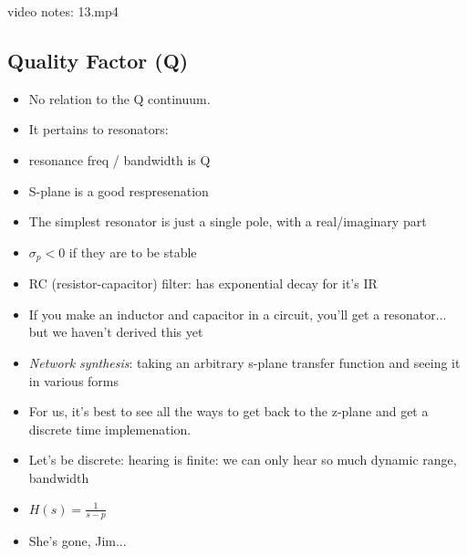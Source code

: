 video notes: 13.mp4


\subsection*{Quality Factor (Q)}
\begin{itemize}

\item{No relation to the Q continuum.}

\item{
It pertains to resonators:
}

\item{resonance freq / bandwidth is Q}

\item{S-plane is a good respresenation}
\item{The simplest resonator is just a single pole, with a 
real/imaginary part}
\item{$\sigma_p < 0$ if they are to be stable}
\item{RC (resistor-capacitor) filter: has exponential decay for it's IR}
\item{If you make an inductor and capacitor in a circuit, you'll get a 
resonator... but we haven't derived this yet}
\item{\textit{Network synthesis}: taking an arbitrary s-plane transfer function and seeing it in 
various forms}
\item{For us, it's best to see all the ways to get back to the z-plane and get
a discrete time implemenation.}
\item{Let's be discrete: hearing is finite: we can only hear so much dynamic range, bandwidth}
\item{$H(s) = \frac{1}{s - p}$}
\item{She's gone, Jim...}
\end{itemize}
